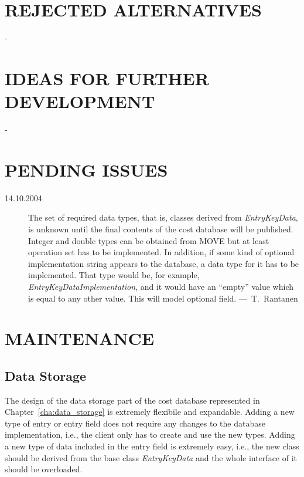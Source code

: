 \documentclass[a4paper,twoside]{tce}
\begin{document}
\chapter{REJECTED ALTERNATIVES}

-



\chapter{IDEAS FOR FURTHER DEVELOPMENT}

-



\chapter{PENDING ISSUES}

\begin{description}

\item[14.10.2004] The set of required data types, that is, classes derived
  from \emph{EntryKeyData}, is unknown until the final contents of the cost
  database will be published. Integer and double types can be obtained from
  MOVE but at least operation set has to be implemented. In addition, if
  some kind of optional implementation string appears to the database, a
  data type for it has to be implemented. That type would be, for example,
  \emph{EntryKeyDataImplementation}, and it would have an ``empty'' value
  which is equal to any other value. This will model optional field.
  ---~T.~Rantanen

\end{description}



\chapter{MAINTENANCE}

\section{Data Storage}

The design of the data storage part of the cost database represented
in Chapter~\ref{cha:data_storage} is extremely flexibile and
expandable. Adding a new type of entry or entry field does not require
any changes to the database implementation, i.e., the client only has
to create and use the new types. Adding a new type of data included in
the entry field is extremely easy, i.e., the new class should be
derived from the base class \emph{EntryKeyData} and the whole
interface of it should be overloaded.
\end{document}
